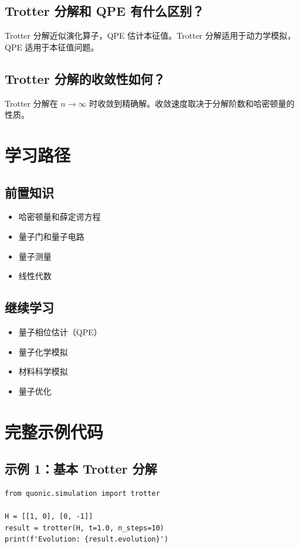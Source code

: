 \documentclass[12pt,a4paper]{article}
\begin{document}
\subsection{Trotter 分解和 QPE 有什么区别？}

Trotter 分解近似演化算子，QPE 估计本征值。Trotter 分解适用于动力学模拟，QPE 适用于本征值问题。

\subsection{Trotter 分解的收敛性如何？}

Trotter 分解在 $n \to \infty$ 时收敛到精确解。收敛速度取决于分解阶数和哈密顿量的性质。

\section{学习路径}

\subsection{前置知识}
\begin{itemize}
  \item 哈密顿量和薛定谔方程
  \item 量子门和量子电路
  \item 量子测量
  \item 线性代数
\end{itemize}

\subsection{继续学习}
\begin{itemize}
  \item 量子相位估计（QPE）
  \item 量子化学模拟
  \item 材料科学模拟
  \item 量子优化
\end{itemize}

\section{完整示例代码}

\subsection{示例 1：基本 Trotter 分解}

\begin{verbatim}
from quonic.simulation import trotter

H = [[1, 0], [0, -1]]
result = trotter(H, t=1.0, n_steps=10)
print(f'Evolution: {result.evolution}')
\end{verbatim}
\end{document}
